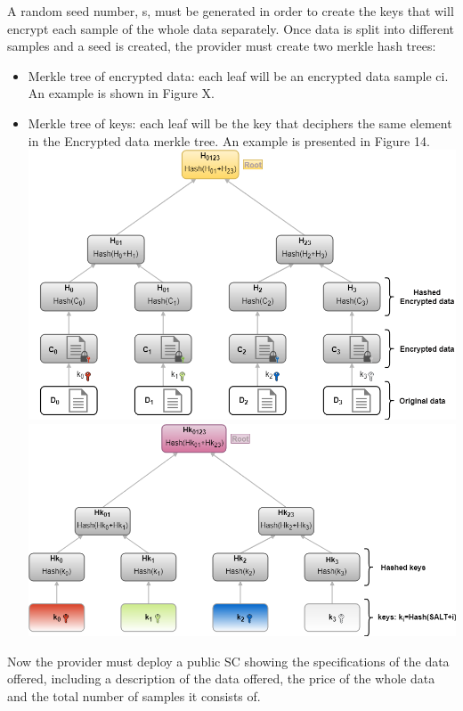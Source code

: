 \documentclass[]{article}
\begin{document}
	A random seed number, s, must be generated in order to create the keys that will encrypt each sample of the whole data separately. Once data is split into different samples and a seed is created, the provider must create two merkle hash trees:
	
	\begin{itemize}
		\item Merkle tree of encrypted data: each leaf will be an encrypted data sample ci. An example is shown in Figure X.
		\item Merkle tree of keys: each leaf will be the key that deciphers the same element in the Encrypted data merkle tree. An example is presented in Figure 14.
		\includegraphics[width=\textwidth,height=\textheight,keepaspectratio]{../figures/MerkleTree_EncryptedData}
		\includegraphics[width=\textwidth,height=\textheight,keepaspectratio]{../figures/MerkleTree_Keys}
	\end{itemize}
	
	Now the provider must deploy a public SC showing the specifications of the data offered, including a description of the data offered, the price of the whole data and the total number of samples it consists of.
	
\end{document}
